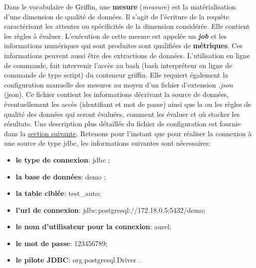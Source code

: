 Dans le vocabulaire de Griffin, une \textbf{mesure} (\textit{measure}) est la mat\'erialisation d'une dimension de  qualit\'e de donn\'ees. Il s'agit de l'\'ecriture de la requ\^ete caract\'erisant les attentes ou sp\'ecificit\'es de la dimension consid\'er\'ee. Elle contient les r\`egles \`a \'evaluer. L'ex\'ecution de cette mesure est appel\'ee un \textbf{\textit{job}} et les informations num\'eriques qui sont produites sont qualifi\'ees de \textbf{m\'etriques}. Ces informations peuvent aussi \^etre des extractions de donn\'ees. L'utilisation en ligne de commande, fait intervenir l'acc\`es au \acrshort{bash} (\acrlong{bash} interpréteur en ligne de commande de type script) du conteneur griffin. Elle requiert \'egalement la configuration manuelle des mesures au moyen d'un fichier d'extension \textit{.json} (\acrfull{json}). Ce fichier contient les informations d\'ecrivant la source de donn\'ees, \'eventuellement les acc\`es (identifiant et mot de passe) ainsi que la ou les r\`egles de qualit\'e des donn\'ees qui seront \'evalu\'ees, comment les \'evaluer et o\`u stocker les r\'esultats. Une description plus d\'etaill\'ee du fichier de configuration est fournie dans la \hyperref[sec:TestGriffin]{section suivante}. Retenons pour l'instant que pour r\'ealiser la connexion \`a une source de type \acrshort{jdbc}, les informations suivantes sont n\'ecessaires:
 \begin{itemize}[parsep=0cm,itemsep=0cm]
 \item \textbf{le type de connexion}: \acrshort{jdbc} ; 
 \item \textbf{la base de donn\'ees}: demo ; 
 \item \textbf{la table cibl\'ee}: test\_auto;
 \item \textbf{l'url de connexion}: jdbc:postgresql://172.18.0.5:5432/demo;
 \item \textbf{le nom d'utilisateur pour la connexion}: aurel;
 \item \textbf{le mot de passe}: 123456789;
 \item \textbf{le pilote JDBC}: org.postgresql.Driver . 
 \end{itemize}
\vspace{0.15cm}

